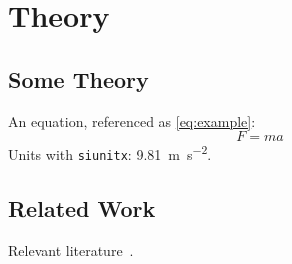 \chapter{Theory}
\label{ch:theory}

\section{Some Theory}
An equation, referenced as \cref{eq:example}:
\begin{equation}
  F = m a
  \label{eq:example}
\end{equation}
Units with \texttt{siunitx}: \qty{9.81}{\metre\per\second\squared}.

\section{Related Work}
Relevant literature~\cite{lamport1994, goossens1993}.
